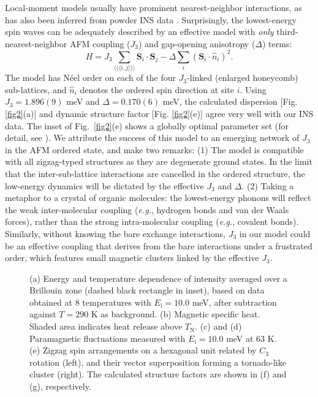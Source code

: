 \documentclass[%
reprint,
superscriptaddress,
amsmath,amssymb,
aps,
prb,
]{revtex4-2}
\begin{document}
Local-moment models usually have prominent nearest-neighbor interactions, as has also been inferred from powder INS data \cite{SongvilayPRB2020,LinNC2021,SamarakoonPRB2021,KimJPCM2021,SandersArxiv2021}. Surprisingly, the lowest-energy spin waves can be adequately described by an effective model with \textit{only} third-nearest-neighbor AFM coupling ($J_3$) and gap-opening anisotropy ($\Delta$) terms:
\begin{equation}
	H = J_3 \sum_{ \langle\langle\langle i,j \rangle\rangle\rangle}\textbf{S}_i\cdot\textbf{S}_j-\Delta\sum_{i}\left(\textbf{S}_i\cdot\hat{n}_i\right)^2.
\label{Eq1}
\end{equation}
The model has N\'{e}el order on each of the four $J_3$-linked (enlarged honeycomb) sub-lattices, and $\hat{n}_i$ denotes the ordered spin direction at site $i$. Using $J_3 = 1.896(9)$ meV and $\Delta = 0.170(6)$ meV, the calculated dispersion [Fig. \ref{fig2}(a)] and dynamic structure factor [Fig. \ref{fig2}(e)] agree very well with our INS data. The inset of Fig.~\ref{fig2}(e) shows a globally optimal parameter set (for detail, see \cite{SM}). We attribute the success of this model to an emerging network of $J_3$ in the AFM ordered state, and make two remarks: (1) The model is compatible with all zigzag-typed structures as they are degenerate ground states. In the limit that the inter-sub-lattice interactions are cancelled in the ordered structure, the low-energy dynamics will be dictated by the effective $J_3$ and $\Delta$. (2) Taking a metaphor to a crystal of organic molecules: the lowest-energy phonons will reflect the weak inter-molecular coupling (\textit{e.g.}, hydrogen bonds and van der Waals forces), rather than the strong intra-molecular coupling (\textit{e.g.}, covalent bonds). Similarly, without knowing the bare exchange interactions, $J_3$ in our model could be an effective coupling that derives from the bare interactions under a frustrated order, which features small magnetic clusters linked by the effective $J_3$.

\begin{figure*}[t!]
\caption{(a) Energy and temperature dependence of intensity averaged over a Brillouin zone (dashed black rectangle in inset), based on data obtained at 8 temperatures with $E_\mathrm{i} = 10.0$ meV, after subtraction against $T=290$ K as background. (b) Magnetic specific heat. Shaded area indicates heat release above $T_\mathrm{N}$. (c) and (d) Paramagnetic fluctuations measured with $E_\mathrm{i} = 10.0$ meV at 63 K. (e) Zigzag spin arrangements on a hexagonal unit related by $C_3$ rotation (left), and their vector superposition forming a tornado-like cluster (right). The calculated structure factors are shown in (f) and (g), respectively.}
\label{fig4}
\end{figure*}
\end{document}
